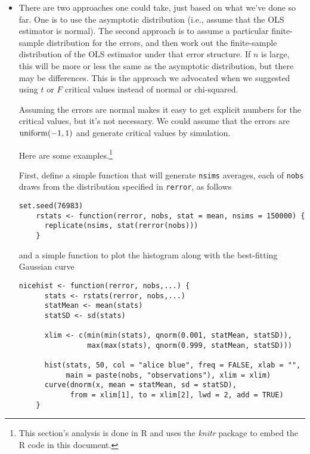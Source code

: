 \begin{itemize}

\item There are two approaches one could take, just based on what
  we've done so far.  One is to use the asymptotic distribution (i.e.,
  assume that the OLS estimator is normal).  The second approach is to
  assume a particular finite-sample distribution for the errors, and
  then work out the finite-sample distribution of the OLS estimator
  under that error structure.  If $n$ is large, this will be more or
  less the same as the asymptotic distribution, but there may be
  differences.  This is the approach we advocated when we suggested
  using $t$ or $F$ critical values instead of normal or chi-squared.

  Assuming the errors are normal makes it easy to get explicit numbers
  for the critical values, but it's not necessary.  We could assume
  that the errors are $\operatorname{uniform}(-1,1)$ and generate critical values by
  simulation.

  Here are some examples.\footnote{This section's analysis is done in
    R \citep{R} and uses the \emph{knitr} package \citep{Xie13} to
    embed the R code in this document.}

  First, define a simple function that will generate \lstinline|nsims|
  averages, each of \lstinline|nobs| draws from the distribution
  specified in \lstinline|rerror|, as follows
  \begin{lstlisting}[firstline=2,gobble=4]
    set.seed(76983)
    rstats <- function(rerror, nobs, stat = mean, nsims = 150000) {
      replicate(nsims, stat(rerror(nobs)))
    }
  \end{lstlisting}
  and a simple function to plot the histogram along with the
  best-fitting Gaussian curve
  \begin{lstlisting}[gobble=4]
    nicehist <- function(rerror, nobs,...) {
      stats <- rstats(rerror, nobs,...)
      statMean <- mean(stats)
      statSD <- sd(stats)
  
      xlim <- c(min(min(stats), qnorm(0.001, statMean, statSD)),
                max(max(stats), qnorm(0.999, statMean, statSD)))

      hist(stats, 50, col = "alice blue", freq = FALSE, xlab = "",
           main = paste(nobs, "observations"), xlim = xlim)
      curve(dnorm(x, mean = statMean, sd = statSD),
            from = xlim[1], to = xlim[2], lwd = 2, add = TRUE)
    }
  \end{lstlisting}


\end{itemize}
